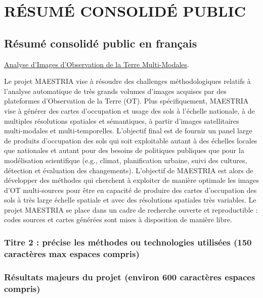 \section{R\'ESUM\'E CONSOLID\'E PUBLIC}
\label{sec:resume}

\subsection{Résumé consolidé public en français}
\underline{Analyse d'Images d'Observation de la Terre Multi-Modales}.

Le projet MAESTRIA vise à résoudre des challenges méthodologiques relatifs à l’analyse automatique de très grands volumes d’images acquises par des plateformes d’Observation de la Terre (OT). Plus spécifiquement, MAESTRIA vise à générer des cartes d’occupation et usage des sols à l’échelle nationale, à de multiples résolutions spatiales et sémantiques, à partir d’images satellitaires multi-modales et multi-temporelles. L’objectif final est de fournir un panel large de produits d’occupation des sols qui soit exploitable autant à des échelles locales que nationales et autant pour des besoins de politiques publiques que pour la modélisation scientifique (e.g., climat, planification urbaine, suivi des cultures, détection et évaluation des changements). L’objectif de MAESTRIA est alors de développer des méthodes qui cherchent à exploiter de manière optimale les images d’OT multi-sources pour être en capacité de produire des cartes d’occupation des sols à très large échelle spatiale et avec des résolutions spatiales très variables. Le projet MAESTRIA se place dans un cadre de recherche ouverte et reproductible : codes sources et cartes générées sont mises à disposition de manière libre.

\subsubsection*{Titre 2 : précise les méthodes ou technologies utilisées (150 caractères max espaces compris)}



\subsubsection*{Résultats majeurs du projet (environ 600 caractères espaces compris)}

